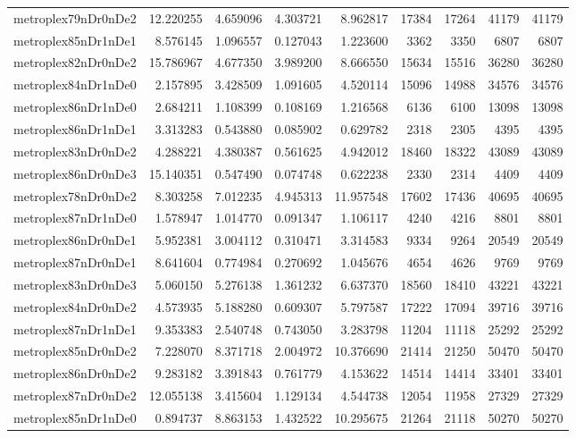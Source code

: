 \begin{longtable}{|l|r|r|r|r|r|r|r|r|}
metroplex79nDr0nDe2 & 12.220255 & 4.659096 & 4.303721 & 8.962817 & 17384 & 17264 & 41179 & 41179 \\
metroplex85nDr1nDe1 & 8.576145 & 1.096557 & 0.127043 & 1.223600 & 3362 & 3350 & 6807 & 6807 \\
metroplex82nDr0nDe2 & 15.786967 & 4.677350 & 3.989200 & 8.666550 & 15634 & 15516 & 36280 & 36280 \\
metroplex84nDr1nDe0 & 2.157895 & 3.428509 & 1.091605 & 4.520114 & 15096 & 14988 & 34576 & 34576 \\
metroplex86nDr1nDe0 & 2.684211 & 1.108399 & 0.108169 & 1.216568 & 6136 & 6100 & 13098 & 13098 \\
metroplex86nDr1nDe1 & 3.313283 & 0.543880 & 0.085902 & 0.629782 & 2318 & 2305 & 4395 & 4395 \\
metroplex83nDr0nDe2 & 4.288221 & 4.380387 & 0.561625 & 4.942012 & 18460 & 18322 & 43089 & 43089 \\
metroplex86nDr0nDe3 & 15.140351 & 0.547490 & 0.074748 & 0.622238 & 2330 & 2314 & 4409 & 4409 \\
metroplex78nDr0nDe2 & 8.303258 & 7.012235 & 4.945313 & 11.957548 & 17602 & 17436 & 40695 & 40695 \\
metroplex87nDr1nDe0 & 1.578947 & 1.014770 & 0.091347 & 1.106117 & 4240 & 4216 & 8801 & 8801 \\
metroplex86nDr0nDe1 & 5.952381 & 3.004112 & 0.310471 & 3.314583 & 9334 & 9264 & 20549 & 20549 \\
metroplex87nDr0nDe1 & 8.641604 & 0.774984 & 0.270692 & 1.045676 & 4654 & 4626 & 9769 & 9769 \\
metroplex83nDr0nDe3 & 5.060150 & 5.276138 & 1.361232 & 6.637370 & 18560 & 18410 & 43221 & 43221 \\
metroplex84nDr0nDe2 & 4.573935 & 5.188280 & 0.609307 & 5.797587 & 17222 & 17094 & 39716 & 39716 \\
metroplex87nDr1nDe1 & 9.353383 & 2.540748 & 0.743050 & 3.283798 & 11204 & 11118 & 25292 & 25292 \\
metroplex85nDr0nDe2 & 7.228070 & 8.371718 & 2.004972 & 10.376690 & 21414 & 21250 & 50470 & 50470 \\
metroplex86nDr0nDe2 & 9.283182 & 3.391843 & 0.761779 & 4.153622 & 14514 & 14414 & 33401 & 33401 \\
metroplex87nDr0nDe2 & 12.055138 & 3.415604 & 1.129134 & 4.544738 & 12054 & 11958 & 27329 & 27329 \\
metroplex85nDr1nDe0 & 0.894737 & 8.863153 & 1.432522 & 10.295675 & 21264 & 21118 & 50270 & 50270 \\

\end{longtable}
